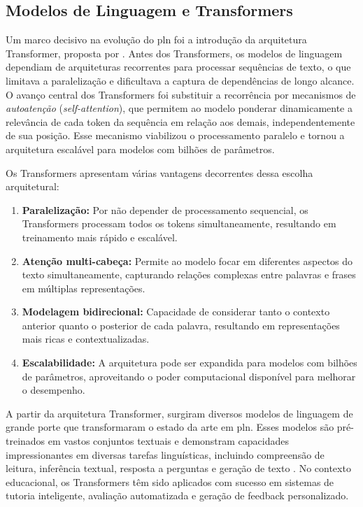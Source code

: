 \subsection{Modelos de Linguagem e Transformers}
\label{subsec:transformers}

Um marco decisivo na evolução do \gls{pln} foi a introdução da arquitetura Transformer, proposta por . Antes dos Transformers, os modelos de linguagem dependiam de arquiteturas recorrentes para processar sequências de texto, o que limitava a paralelização e dificultava a captura de dependências de longo alcance. O avanço central dos Transformers foi substituir a recorrência por mecanismos de \textit{autoatenção} (\textit{self-attention}), que permitem ao modelo ponderar dinamicamente a relevância de cada token da sequência em relação aos demais, independentemente de sua posição. Esse mecanismo viabilizou o processamento paralelo e tornou a arquitetura escalável para modelos com bilhões de parâmetros.

Os Transformers apresentam várias vantagens decorrentes dessa escolha arquitetural:

\begin{enumerate}
  \item \textbf{Paralelização:} Por não depender de processamento sequencial, os Transformers processam todos os tokens simultaneamente, resultando em treinamento mais rápido e escalável.

  \item \textbf{Atenção multi-cabeça:} Permite ao modelo focar em diferentes aspectos do texto simultaneamente, capturando relações complexas entre palavras e frases em múltiplas representações.

  \item \textbf{Modelagem bidirecional:} Capacidade de considerar tanto o contexto anterior quanto o posterior de cada palavra, resultando em representações mais ricas e contextualizadas.

  \item \textbf{Escalabilidade:} A arquitetura pode ser expandida para modelos com bilhões de parâmetros, aproveitando o poder computacional disponível para melhorar o desempenho.
\end{enumerate}

A partir da arquitetura Transformer, surgiram diversos modelos de linguagem de grande porte que transformaram o estado da arte em \gls{pln}. Esses modelos são pré-treinados em vastos conjuntos textuais e demonstram capacidades impressionantes em diversas tarefas linguísticas, incluindo compreensão de leitura, inferência textual, resposta a perguntas e geração de texto \cite{chen_evaluating_2021}. No contexto educacional, os Transformers têm sido aplicados com sucesso em sistemas de tutoria inteligente, avaliação automatizada e geração de feedback personalizado.

